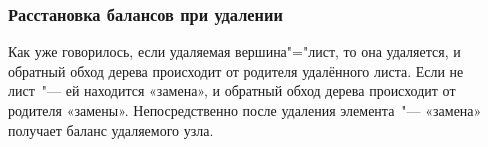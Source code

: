 \begin{frame}
    \frametitle{Расстановка балансов при удалении}

    Как уже говорилось, если удаляемая вершина"="лист, то она удаляется,
    и обратный обход дерева происходит от родителя удалённого листа.
    Если не лист "--- ей находится «замена», и обратный обход дерева происходит от родителя «замены».
    Непосредственно после удаления элемента "--- «замена» получает баланс удаляемого узла.

\end{frame}